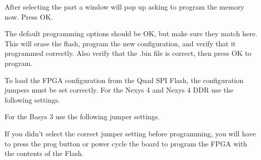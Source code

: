 \documentclass[letterpaper]{article}
\begin{document}

After selecting the part a window will pop up asking to program the memory now.
Press OK.


The default programming options should be OK, but make sure they match here.
This will erase the flash, program the new configuration, and verify that it programmed correctly.
Also verify that the .bin file is correct, then press OK to program.


To load the FPGA configuration from the Quad SPI Flash, the configuration jumpers must be
set correctly.
For the Nexys 4 and Nexys 4 DDR use the following settings.

\begin{center}
\end{center}

For the Basys 3 use the following jumper settings.

\begin{center}
\end{center}

If you didn't select the correct jumper setting before programming, you will have to press
the prog button or power cycle the board to program the FPGA with the contents of the Flash.
\end{document}
